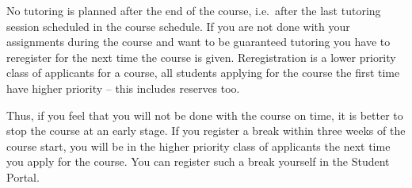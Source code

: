 \documentclass[a4paper]{llncs}
\begin{document}
No tutoring is planned after the end of the course, i.e.~after the last 
tutoring session scheduled in the course schedule.
If you are not done with your assignments during the course and want to be 
guaranteed tutoring you have to reregister for the next time the course is 
given.
Reregistration is a lower priority class of applicants for a course, all 
students applying for the course the first time have higher priority -- this 
includes reserves too.


Thus, if you feel that you will not be done with the course on time, it is 
better to stop the course at an early stage.
If you register a break within three weeks of the course start, you will be in 
the higher priority class of applicants the next time you apply for the course.
You can register such a break yourself in the Student Portal.


\printbibliography{}
\end{document}
